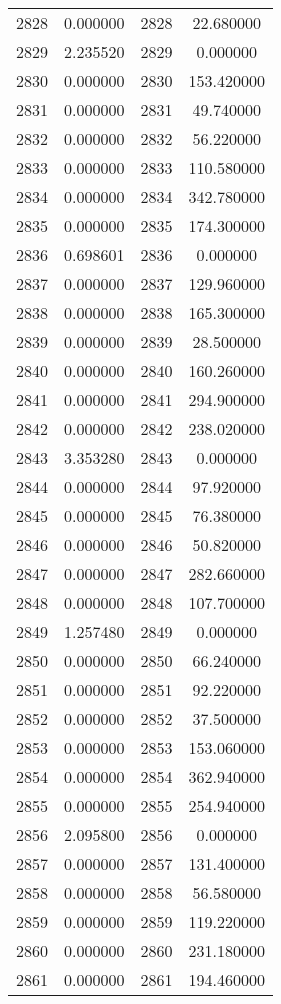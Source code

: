 \documentclass[12pt]{article}
\begin{document}
\begin{longtable}{@{}cccc@{}}
2828 & 0.000000 & 2828 & 22.680000 \\
2829 & 2.235520 & 2829 & 0.000000 \\
2830 & 0.000000 & 2830 & 153.420000 \\
2831 & 0.000000 & 2831 & 49.740000 \\
2832 & 0.000000 & 2832 & 56.220000 \\
2833 & 0.000000 & 2833 & 110.580000 \\
2834 & 0.000000 & 2834 & 342.780000 \\
2835 & 0.000000 & 2835 & 174.300000 \\
2836 & 0.698601 & 2836 & 0.000000 \\
2837 & 0.000000 & 2837 & 129.960000 \\
2838 & 0.000000 & 2838 & 165.300000 \\
2839 & 0.000000 & 2839 & 28.500000 \\
2840 & 0.000000 & 2840 & 160.260000 \\
2841 & 0.000000 & 2841 & 294.900000 \\
2842 & 0.000000 & 2842 & 238.020000 \\
2843 & 3.353280 & 2843 & 0.000000 \\
2844 & 0.000000 & 2844 & 97.920000 \\
2845 & 0.000000 & 2845 & 76.380000 \\
2846 & 0.000000 & 2846 & 50.820000 \\
2847 & 0.000000 & 2847 & 282.660000 \\
2848 & 0.000000 & 2848 & 107.700000 \\
2849 & 1.257480 & 2849 & 0.000000 \\
2850 & 0.000000 & 2850 & 66.240000 \\
2851 & 0.000000 & 2851 & 92.220000 \\
2852 & 0.000000 & 2852 & 37.500000 \\
2853 & 0.000000 & 2853 & 153.060000 \\
2854 & 0.000000 & 2854 & 362.940000 \\
2855 & 0.000000 & 2855 & 254.940000 \\
2856 & 2.095800 & 2856 & 0.000000 \\
2857 & 0.000000 & 2857 & 131.400000 \\
2858 & 0.000000 & 2858 & 56.580000 \\
2859 & 0.000000 & 2859 & 119.220000 \\
2860 & 0.000000 & 2860 & 231.180000 \\
2861 & 0.000000 & 2861 & 194.460000 \\

\end{longtable}
\end{document}
